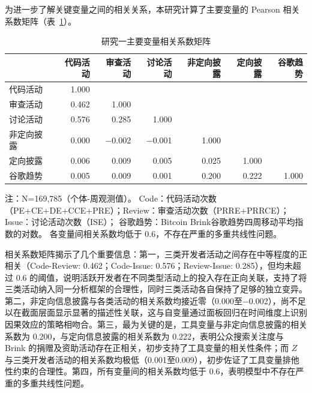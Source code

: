 \documentclass[
    type = master, %
    degree = professional,        %
    decl-page,  %
    twoside,                %
    fontset = fandol %
  ]{njuthesis}
\renewcommand{\footnotesize}{\zihao{-5}}
\begin{document}
为进一步了解关键变量之间的相关关系，本研究计算了主要变量的 Pearson 相关系数矩阵（表~\ref{tab:correlation}）。

\begin{table}[htbp]
    \centering
    \caption{研究一主要变量相关系数矩阵}
    \label{tab:correlation}
    \small
    \begin{tabularx}{\textwidth}{Xrrrrrr}
        \toprule
        & 代码活动 & 审查活动 & 讨论活动 & 非定向披露 & 定向披露 & 谷歌趋势 \\
        \midrule
        代码活动     & 1.000 & & & & & \\
        审查活动   & 0.462 & 1.000 & & & & \\
        讨论活动    & 0.576 & 0.285 & 1.000 & & & \\
        非定向披露  & 0.000 & $-$0.002 & $-$0.001 & 1.000 & & \\
        定向披露    & 0.006 & 0.009 & 0.005 & 0.025 & 1.000 & \\
        谷歌趋势        & 0.005 & 0.009 & 0.001 & 0.200 & 0.222 & 1.000 \\
        \bottomrule
    \end{tabularx}
    \begin{minipage}{\textwidth}
        \vspace{0.3em}
        \footnotesize 注：N=169,785（个体-周观测值）。
        Code：代码活动次数（PE+CE+DE+CCE+PRE）；Review：审查活动次数（PRRE+PRRCE）；Issue：讨论活动次数（ISE）；
        谷歌趋势：Bitcoin Brink谷歌趋势四周移动平均指数的对数。
        各变量间相关系数均低于 0.6，不存在严重的多重共线性问题。
    \end{minipage}
\end{table}

相关系数矩阵揭示了几个重要信息：第一，三类开发者活动之间存在中等程度的正相关（Code-Review: 0.462；Code-Issue: 0.576；Review-Issue: 0.285），但均未超过 0.6 的阈值，说明活跃开发者在不同类型活动上的投入存在正向关联，支持了将三类活动纳入同一分析框架的合理性，同时三类活动各自保持了足够的独立变异。第二，非定向信息披露与各类活动的相关系数均接近零（0.000至$-$0.002），尚不足以在截面层面显示显著的描述性关联，这与自变量通过面板回归在时间维度上识别因果效应的策略相吻合。第三，最为关键的是，工具变量与非定向信息披露的相关系数为 0.200，与定向信息披露的相关系数为 0.222，表明公众搜索关注度与 Brink 的捐赠及资助活动存在正相关，初步支持了工具变量的相关性条件；而 $Z$ 与三类开发者活动的相关系数均极低（0.001至0.009），初步佐证了工具变量排他性约束的合理性。第四，所有变量间的相关系数均低于 0.6，表明模型中不存在严重的多重共线性问题。
\end{document}
